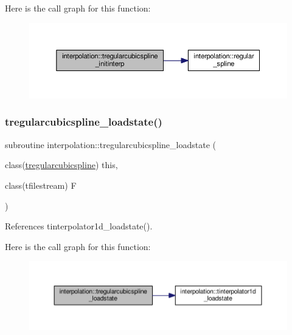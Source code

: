 Here is the call graph for this function\+:
\nopagebreak
\begin{figure}[H]
\begin{center}
\leavevmode
\includegraphics[width=350pt]{namespaceinterpolation_a771257f70f21fe027a53de95c8e6454d_cgraph}
\end{center}
\end{figure}
\mbox{\label{namespaceinterpolation_a5fa8f1fc11b994b0bae323cbe4bd5512}} 
\subsubsection{\texorpdfstring{tregularcubicspline\+\_\+loadstate()}{tregularcubicspline\_loadstate()}}
{\footnotesize\ttfamily subroutine interpolation\+::tregularcubicspline\+\_\+loadstate (\begin{DoxyParamCaption}\item[{class(\mbox{\hyperlink{structinterpolation_1_1tregularcubicspline}{tregularcubicspline}})}]{this,  }\item[{class(tfilestream)}]{F }\end{DoxyParamCaption})}



References tinterpolator1d\+\_\+loadstate().

Here is the call graph for this function\+:
\nopagebreak
\begin{figure}[H]
\begin{center}
\leavevmode
\includegraphics[width=350pt]{namespaceinterpolation_a5fa8f1fc11b994b0bae323cbe4bd5512_cgraph}
\end{center}
\end{figure}
\mbox{\label{namespaceinterpolation_a387cdc39d5949cc2aa2e5c6f483ea76c}} 
